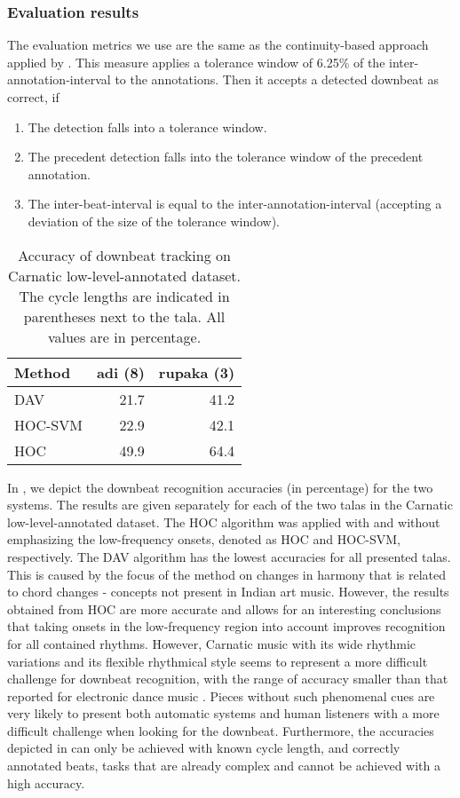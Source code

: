 \subsubsection{Evaluation results}
The evaluation metrics we use are the same as the continuity-based approach applied by . This measure applies a tolerance window of 6.25\% of the inter-annotation-interval to the annotations. Then it accepts a detected downbeat as correct, if 
\begin{enumerate}[nolistsep]
 \item The detection falls into a tolerance window.
 \item The precedent detection falls into the tolerance window of the precedent annotation.
 \item The inter-beat-interval is equal to the inter-annotation-interval (accepting a deviation of the size of the tolerance window).
\end{enumerate}
%
\begin{table}
\centering
\begin{tabular}{@{}lrr@{}} \toprule
Method & \gls{adi} (8) & \gls{rupaka} (3) \tabularnewline \midrule
\acrshort{DAV} & 21.7 & 41.2    \tabularnewline
\acrshort{HOC-SVM} & 22.9 & 42.1 \tabularnewline
\acrshort{HOC} & 49.9 & 64.4 \tabularnewline \bottomrule
\end{tabular}
\caption[Accuracy of downbeat tracking in Carnatic low-level-annotated dataset]{Accuracy of downbeat tracking on Carnatic low-level-annotated dataset. The cycle lengths are indicated in parentheses next to the \gls{tala}. All values are in percentage.}\label{tab:jnmreval:dbres} 
\end{table}
In , we depict the downbeat recognition accuracies (in percentage) for the two systems. The results are given separately for each of the two \glspl{tala} in the Carnatic low-level-annotated dataset. The \acrshort{HOC} algorithm was applied with and without emphasizing the low-frequency onsets, denoted as \acrshort{HOC} and \acrshort{HOC-SVM}, respectively. The \acrshort{DAV} algorithm has the lowest accuracies for all presented \glspl{tala}. This is caused by the focus of the method on changes in harmony that is related to chord changes - concepts not present in Indian art music. However, the results obtained from \acrshort{HOC} are more accurate and allows for an interesting conclusions that taking onsets in the low-frequency region into account improves recognition for all contained rhythms. However, Carnatic music with its wide rhythmic variations and its flexible rhythmical style seems to represent a more difficult challenge for downbeat recognition, with the range of accuracy smaller than that reported for electronic dance music \cite{hockman:12:downbeat}. Pieces without such phenomenal cues are very likely to present both automatic systems and human listeners with a more difficult challenge when looking for the downbeat. Furthermore, the accuracies depicted in  can only be achieved with known cycle length, and correctly annotated beats, tasks that are already complex and cannot be achieved with a high accuracy. 